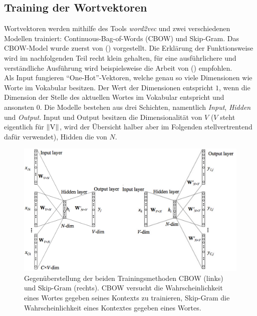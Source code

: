   \subsection{Training der Wortvektoren}

  Wortvektoren werden mithilfe des Tools \emph{word2vec} und zwei verschiedenen Modellen trainiert: Continuous-Bag-of-Words (CBOW)
  und Skip-Gram. Das CBOW-Model wurde zuerst von (\cite{mikolov2013efficient}) vorgestellt. Die Erklärung der Funktionsweise
  wird im nachfolgenden Teil recht klein gehalten, für eine ausführlichere und verständliche Ausführung wird beispielsweise
  die Arbeit von (\cite{rong2014word2vec}) empfohlen.\\

  Als Input fungieren ``One-Hot''-Vektoren, welche genau so viele Dimensionen wie Worte im Vokabular besitzen.
  Der Wert der Dimensionen entspricht $1$, wenn die Dimension der Stelle des aktuellen Wortes im Vokabular entspricht und
  ansonsten $0$. Die Modelle bestehen aus drei Schichten, namentlich \emph{Input}, \emph{Hidden} und \emph{Output}.
  Input und Output besitzen die Dimensionalität von $V$ ($V$ steht eigentlich für $\|\textsc{V}\|$, wird der Übersicht halber
  aber im Folgenden stellvertrentend dafür verwendet), Hidden die von $N$.\\

  \begin{figure}[h]
    \centering
    \includegraphics[width=1.1\textwidth]{../img/cbowskip.png}
    \caption[Gegenüberstellung von Skip-Gram und CBOW]{Gegenüberstellung der beiden Trainingsmethoden CBOW (links)
    und Skip-Gram (rechts). CBOW versucht die Wahrscheinlichkeit eines Wortes gegeben seines Kontexts zu trainieren,
    Skip-Gram die Wahrscheinlichkeit eines Kontextes gegeben eines Wortes.}
  \end{figure}

